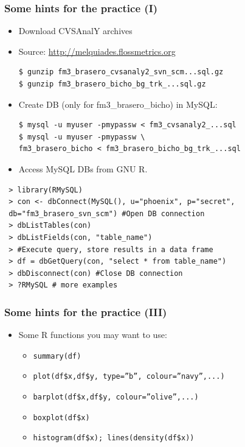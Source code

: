 \documentclass{beamer}
\begin{document}
\begin{frame}[fragile]
\frametitle{Some hints for the practice (I)}
\begin{itemize}
\item Download CVSAnalY archives\\
\item Source: \url{http://melquiades.flossmetrics.org}
 \begin{verbatim}
$ gunzip fm3_brasero_cvsanaly2_svn_scm...sql.gz
$ gunzip fm3_brasero_bicho_bg_trk_...sql.gz
\end{verbatim}
\item Create DB (only for fm3\_brasero\_bicho) in MySQL:
\begin{verbatim}
$ mysql -u myuser -pmypassw < fm3_cvsanaly2_...sql
$ mysql -u myuser -pmypassw \
fm3_brasero_bicho < fm3_brasero_bicho_bg_trk_...sql
 \end{verbatim}
\end{itemize}
\end{frame}

\begin{frame}[fragile]

\begin{itemize}
 \item Access MySQL DBs from GNU R.
\end{itemize}
\vspace{-0.5cm}
\begin{verbatim}
 > library(RMySQL)
 > con <- dbConnect(MySQL(), u="phoenix", p="secret",
 db="fm3_brasero_svn_scm") #Open DB connection
 > dbListTables(con)
 > dbListFields(con, "table_name")
 > #Execute query, store results in a data frame
 > df = dbGetQuery(con, "select * from table_name") 
 > dbDisconnect(con) #Close DB connection
 > ?RMySQL # more examples
\end{verbatim}

\end{frame}

\begin{frame}[fragile]
\frametitle{Some hints for the practice (III)}
\begin{itemize}
\item Some R functions you may want to use:
  \begin{itemize}
  \item \texttt{summary(df)}
  \item \texttt{plot(df\$x,df\$y, type=''b'', colour=''navy'',...)}
  \item \texttt{barplot(df\$x,df\$y, colour=''olive'',...)}
  \item \texttt{boxplot(df\$x)}
  \item \texttt{histogram(df\$x); lines(density(df\$x))}
  \end{itemize}
\end{itemize}
\end{frame}
\end{document}

